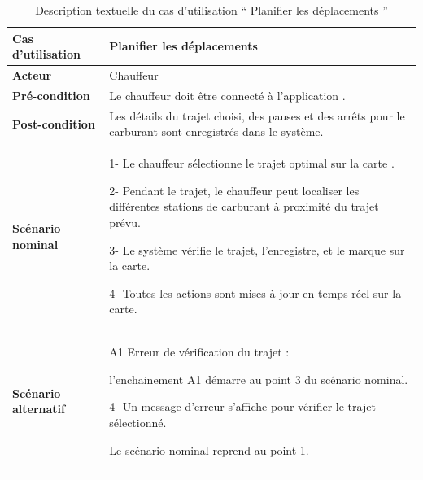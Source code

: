 \begin{table}[htbp]
    \centering
    \renewcommand{\arraystretch}{1.5}
    \begin{tabular}{|p{4cm}|p{9.5cm}|}
        \hline
        \textbf{Cas d'utilisation}   & Planifier les déplacements                                                                                 \\
        \hline
        \textbf{Acteur}              & Chauffeur                                                                                                  \\
        \hline
        \textbf{Pré-condition}       & Le chauffeur doit être connecté à l'application  .                                                         \\


        \hline
        \textbf{Post-condition}      & Les détails du trajet choisi, des pauses et des arrêts pour le carburant sont enregistrés dans le système. \\
        \hline
        \textbf{Scénario nominal}    & 1- Le chauffeur sélectionne le trajet optimal sur la carte .\newline

        2- Pendant le trajet, le chauffeur peut localiser les différentes stations de carburant à proximité du trajet prévu.\newline

        3- Le système vérifie le trajet, l'enregistre, et le marque sur la carte.\newline

        4- Toutes les actions sont mises à jour en temps réel sur la carte.
        \\
        \hline
        \textbf{Scénario alternatif} & A1 Erreur de vérification du trajet : \newline

        l'enchainement A1 démarre au point 3 du scénario nominal.\newline

        4- Un message d'erreur s'affiche pour vérifier le trajet sélectionné. \newline

        Le scénario nominal reprend au point 1.                                                                                                   \\
        \hline
    \end{tabular}
    \caption{Description textuelle du cas d’utilisation “ Planifier les déplacements ”}
\end{table}



